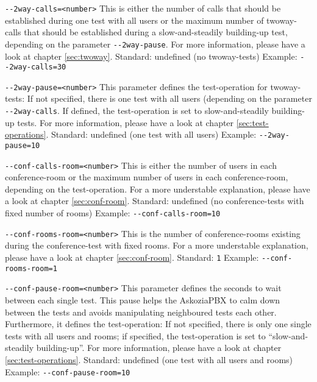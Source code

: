 \begin{description}
\item {\texttt{-{}-2way-calls=<number>}} \newline
This is either the number of calls that should be established during one test with all users
or the maximum number of twoway-calls that should be established during a slow-and-steadily
building-up test, depending on the parameter \texttt{-{}-2way-pause}.
For more information, please have a look at chapter \ref{sec:twoway}.
\newline Standard: undefined (no twoway-tests)
\newline Example: \texttt{-{}-2way-calls=30}

\item {\texttt{-{}-2way-pause=<number>}} \newline
This parameter defines the test-operation for twoway-tests: If not specified, there is one
test with all users (depending on the parameter \texttt{-{}-2way-calls}. If defined, the
test-operation is set to slow-and-steadily building-up tests.
For more information, please have a look at chapter \ref{sec:test-operations}.
\newline Standard: undefined (one test with all users)
\newline Example: \texttt{-{}-2way-pause=10}

\item {\texttt{-{}-conf-calls-room=<number>}} \newline
This is either the number of users in each conference-room or the maximum number of users in
each conference-room, depending on the test-operation.
For a more understable explanation, please have a look at chapter \ref{sec:conf-room}.
\newline Standard: undefined (no conference-tests with fixed number of rooms)
\newline Example: \texttt{-{}-conf-calls-room=10}

\item {\texttt{-{}-conf-rooms-room=<number>}} \newline
This is the number of conference-rooms existing during the conference-test with fixed rooms.
For a more understable explanation, please have a look at chapter \ref{sec:conf-room}.
\newline Standard: \texttt{1}
\newline Example: \texttt{-{}-conf-rooms-room=1}

\item {\texttt{-{}-conf-pause-room=<number>}} \newline
This parameter defines the seconds to wait between each single test.
This pause helps the AskoziaPBX to calm down between the tests and avoids manipulating
neighboured tests each other. Furthermore, it defines the test-operation: If not specified,
there is only one single tests with all users and rooms; if specified, the test-operation
is set to ``slow-and-steadily building-up''.
For more information, please have a look at chapter \ref{sec:test-operations}.
\newline Standard: undefined (one test with all users and rooms)
\newline Example: \texttt{-{}-conf-pause-room=10}


\end{description}
